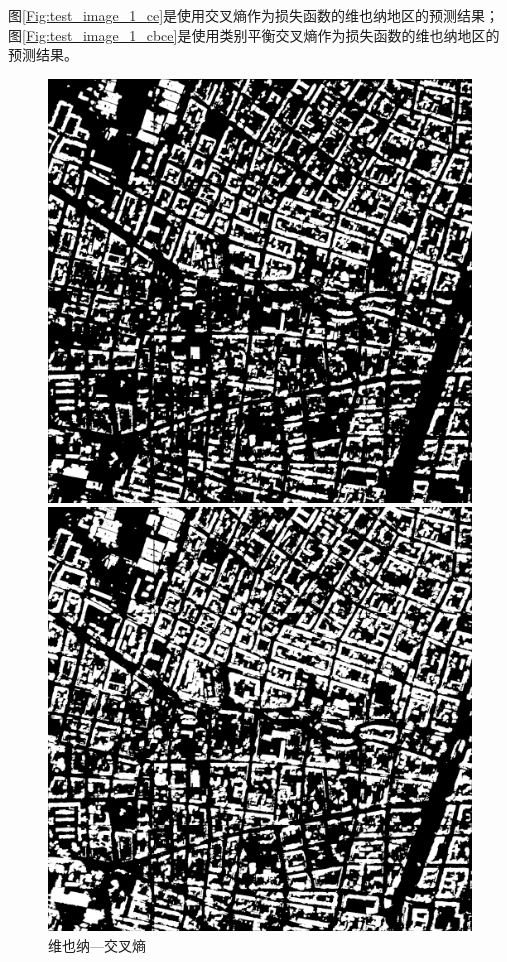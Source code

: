 图\ref{Fig:test_image_1_ce}是使用交叉熵作为损失函数的维也纳地区的预测结果；图\ref{Fig:test_image_1_cbce}是使用类别平衡交叉熵作为损失函数的维也纳地区的预测结果。
\begin{figure}[htbp]
    
    \centering
    \begin{minipage}[t]{0.49\linewidth}
        \centering
        \includegraphics[width=1\linewidth]{Figures/结果/vienna8_交叉熵_中值滤波.png}
        \caption{维也纳—交叉熵}
        \label{Fig:test_image_2_ce}
    \end{minipage}
    \begin{minipage}[t]{0.49\linewidth}
        \centering
        \includegraphics[width=1\linewidth]{Figures/结果/vienna8_平衡_中值滤波.png}

\end{minipage}
\end{figure}
